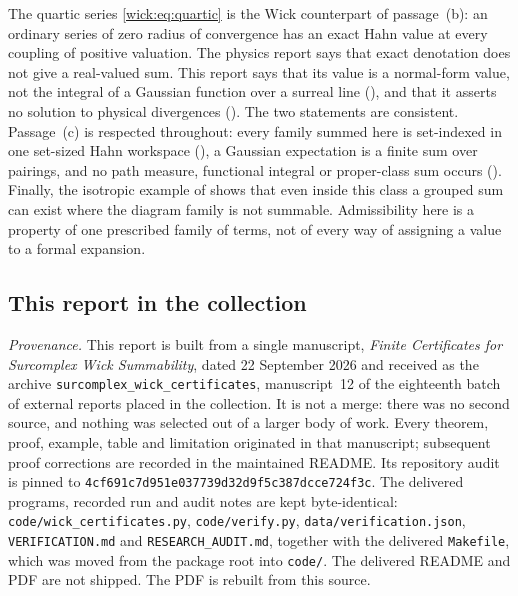 \documentclass[11pt,letterpaper]{article}
\numberwithin{equation}{section}
\theoremstyle{definition}
\theoremstyle{remark}
\newcommand{\Commit}{\nolinkurl{4cf691c7d951e037739d32d9f5c387dcce724f3c}}
\begin{document}
The quartic series \eqref{wick:eq:quartic} is the Wick counterpart of
passage~(b): an ordinary series of zero radius of convergence has an exact
Hahn value at every coupling of positive valuation. The physics report says
that exact denotation does not give a real-valued sum. This report says that
its value is a normal-form value, not the integral of a Gaussian function
over a surreal line (), and that it asserts no
solution to physical divergences (). The two
statements are consistent. Passage~(c) is respected throughout: every family
summed here is set-indexed in one set-sized Hahn workspace
(), a Gaussian expectation is a finite sum over
pairings, and no path measure, functional integral or proper-class sum
occurs (). Finally, the isotropic example of
 shows that even inside this class a grouped sum
can exist where the diagram family is not summable. Admissibility here is a
property of one prescribed family of terms, not of every way of assigning a
value to a formal expansion.

\subsection{This report in the collection}
\label{wick:sub:collection}

\emph{Provenance.} This report is built from a single manuscript,
\emph{Finite Certificates for Surcomplex Wick Summability}, dated 22 September
2026 and received as the archive \texttt{surcomplex\_wick\_certificates},
manuscript~12 of the eighteenth batch of external reports placed in the
collection. It is not a merge: there was no second source, and nothing was
selected out of a larger body of work. Every theorem, proof, example,
table and limitation originated in that manuscript; subsequent proof
corrections are recorded in the maintained README. Its repository audit is
pinned to \Commit. The delivered programs, recorded run and audit notes are
kept byte-identical: \texttt{code/wick\_certificates.py},
\texttt{code/verify.py}, \texttt{data/verification.json},
\texttt{VERIFICATION.md} and \texttt{RESEARCH\_AUDIT.md}, together with the
delivered \texttt{Makefile}, which was moved from the package root into
\texttt{code/}. The delivered README and PDF are not shipped. The PDF is
rebuilt from this source.
\end{document}

